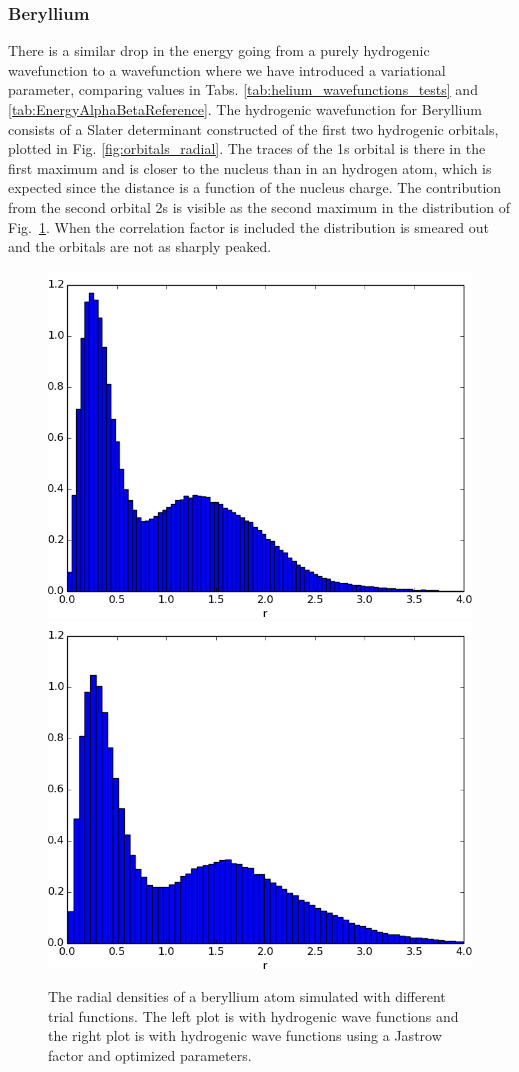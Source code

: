 		\subsubsection{Beryllium}
			There is a similar drop in the energy going from a purely hydrogenic wavefunction to a wavefunction where we have introduced a variational parameter, comparing values in Tabs. \ref{tab:helium_wavefunctions_tests} and \ref{tab:EnergyAlphaBetaReference}.
			The hydrogenic wavefunction for Beryllium consists of a Slater determinant constructed of the first two hydrogenic orbitals, plotted in Fig. \ref{fig:orbitals_radial}. The traces of the 1s orbital is there in the first maximum and is closer to the nucleus than in an hydrogen atom, which is expected since the distance is a function of the nucleus charge. The contribution from the second orbital 2s is visible as the second maximum in the distribution of Fig.~\ref{fig:oneBodyDensityBeryllium}. When the correlation factor is included the distribution is smeared out and the orbitals are not as sharply peaked.


			\begin{figure}
				\centering \includegraphics[width=0.49\linewidth]{content/Results/figures/ChargeDensityBerylliumSimple}
				\centering \includegraphics[width=0.49\linewidth]{content/Results/figures/ChargeDensityBeryllium}
				\protect\caption{The radial densities of a beryllium atom simulated with different trial functions. The left plot is with hydrogenic wave functions and the right plot is with hydrogenic wave functions using a Jastrow factor and optimized parameters.}
				\label{fig:oneBodyDensityBeryllium}
			\end{figure}


